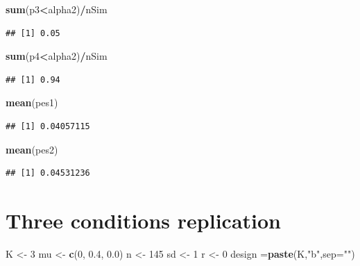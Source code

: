 \documentclass[]{book}
\newenvironment{Shaded}{\begin{snugshade}}{\end{snugshade}}
\newcommand{\DataTypeTok}[1]{\textcolor[rgb]{0.13,0.29,0.53}{#1}}
\newcommand{\DecValTok}[1]{\textcolor[rgb]{0.00,0.00,0.81}{#1}}
\newcommand{\FloatTok}[1]{\textcolor[rgb]{0.00,0.00,0.81}{#1}}
\newcommand{\KeywordTok}[1]{\textcolor[rgb]{0.13,0.29,0.53}{\textbf{#1}}}
\newcommand{\NormalTok}[1]{#1}
\newcommand{\OperatorTok}[1]{\textcolor[rgb]{0.81,0.36,0.00}{\textbf{#1}}}
\newcommand{\StringTok}[1]{\textcolor[rgb]{0.31,0.60,0.02}{#1}}
\begin{document}
\begin{Shaded}
\begin{Highlighting}[]
\KeywordTok{sum}\NormalTok{(p3}\OperatorTok{<}\NormalTok{alpha2)}\OperatorTok{/}\NormalTok{nSim}
\end{Highlighting}
\end{Shaded}

\begin{verbatim}
## [1] 0.05
\end{verbatim}

\begin{Shaded}
\begin{Highlighting}[]
\KeywordTok{sum}\NormalTok{(p4}\OperatorTok{<}\NormalTok{alpha2)}\OperatorTok{/}\NormalTok{nSim}
\end{Highlighting}
\end{Shaded}

\begin{verbatim}
## [1] 0.94
\end{verbatim}

\begin{Shaded}
\begin{Highlighting}[]
\KeywordTok{mean}\NormalTok{(pes1)}
\end{Highlighting}
\end{Shaded}

\begin{verbatim}
## [1] 0.04057115
\end{verbatim}

\begin{Shaded}
\begin{Highlighting}[]
\KeywordTok{mean}\NormalTok{(pes2)}
\end{Highlighting}
\end{Shaded}

\begin{verbatim}
## [1] 0.04531236
\end{verbatim}

\hypertarget{three-conditions-replication-1}{%
\section{Three conditions replication}\label{three-conditions-replication-1}}

\begin{Shaded}
\begin{Highlighting}[]
\NormalTok{K <-}\StringTok{ }\DecValTok{3}
\NormalTok{mu <-}\StringTok{ }\KeywordTok{c}\NormalTok{(}\DecValTok{0}\NormalTok{, }\FloatTok{0.4}\NormalTok{, }\FloatTok{0.0}\NormalTok{)}
\NormalTok{n <-}\StringTok{ }\DecValTok{145}
\NormalTok{sd <-}\StringTok{ }\DecValTok{1}
\NormalTok{r <-}\StringTok{ }\DecValTok{0}
\NormalTok{design =}\KeywordTok{paste}\NormalTok{(K,}\StringTok{"b"}\NormalTok{,}\DataTypeTok{sep=}\StringTok{""}\NormalTok{)}
\end{Highlighting}
\end{Shaded}
\end{document}
